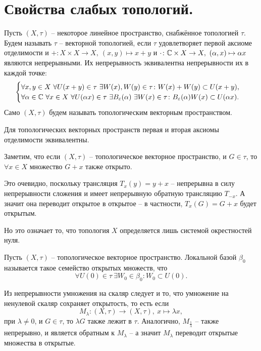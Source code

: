 \section{Свойства слабых топологий.}
\begin{definition}
    Пусть $(X, \tau)$ -- некоторое линейное пространство, снабжённое топологией $\tau$.
    Будем называть $\tau$ -- векторной топологией, если $\tau$ удовлетворяет первой аксиоме отделимости и $+\colon X \times X \to X, \ (x, y) \mapsto x + y$ и $\cdot\colon \mathbb{C} \times X \to X, \ (\alpha, x) \mapsto \alpha x$ являются непрерывными.
    Их непрерывность эквивалентна непрерывности их в каждой точке:
    \[
        \begin{cases}
            \forall x, y \in X \ \forall U(x + y) \in \tau \ \exists W(x), W(y) \in \tau\colon W(x) + W(y) \subset U(x + y), \\
            \forall \alpha \in \mathbb{C}\ \forall x \in X \ \forall U(\alpha x) \in \tau \ \exists B_{\varepsilon}(\alpha) \ \exists W(x) \in \tau \colon B_{\varepsilon}(\alpha)W(x) \subset U(\alpha x).
        \end{cases}
    \]
    Само $(X, \tau)$ будем называть топологическим векторным пространством.
\end{definition}
\begin{note}
    Для топологических векторных пространств первая и вторая аксиомы отделимости эквивалентны.
\end{note}
\begin{note}
    Заметим, что если $(X, \tau)$ -- топологическое векторное пространство, и $G \in \tau$, то $\forall x \in X$ множество $G + x$ также открыто.

    Это очевидно, поскольку трансляция $T_{x}(y) = y + x$ -- непрерывна в силу непрерывности сложения и имеет непрерывную обратную трансляцию $T_{-x}$.
    А значит она переводит открытое в открытое -- в частности, $T_x (G) = G + x$ будет открытым.

    Но это означает то, что топология $X$ определяется лишь системой окрестностей нуля.
\end{note}
\begin{definition}
    Пусть $(X, \tau)$ -- топологическое векторное пространство.
    Локальной базой $\beta_0$ называется такое семейство открытых множеств, что
    \[
        \forall U(0) \in \tau \ \exists W_0 \in \beta_0\colon W_0 \subset U(0).
    \]
\end{definition}
\begin{note}
    Из непрерывности умножения на скаляр следует и то, что умножение на ненулевой скаляр сохраняет открытость, то есть если
    \[
        M_{\lambda}\colon (X, \tau) \to (X, \tau), \ x \mapsto \lambda x,
    \]
    при $\lambda \neq 0$, и $G \in \tau$, то $\lambda G$ также лежит в $\tau$.
    Аналогично, $M_{\frac{1}{\lambda}}$ -- также непрерывно, и является обратным к $M_\lambda$ -- а значит $M_\lambda$ переводит открытые множества в открытые.
\end{note}
